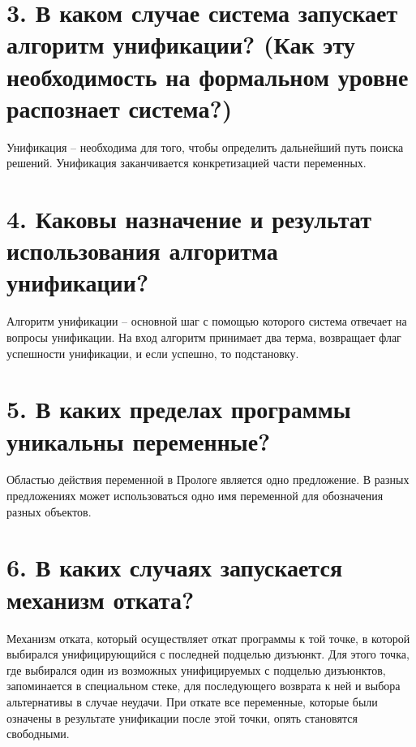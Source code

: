 \section*{3. В каком случае система запускает алгоритм унификации? (Как эту необходимость на формальном уровне распознает система?)}
Унификация – необходима для того, чтобы определить дальнейший путь поиска решений. Унификация заканчивается конкретизацией части переменных.

\section*{4. Каковы назначение и результат использования алгоритма унификации?}
Алгоритм унификации – основной шаг с помощью которого система отвечает на вопросы унификации. 
На вход алгоритм принимает два терма, возвращает флаг успешности унификации, и если успешно, то подстановку.

\section*{5. В каких пределах программы уникальны переменные?}
Областью действия переменной в Прологе является одно предложение.
В разных предложениях может использоваться одно имя переменной для обозначения разных объектов.

\section*{6. В каких случаях запускается механизм отката?}
Механизм отката, который осуществляет откат программы к той точке, в которой выбирался унифицирующийся с последней подцелью дизъюнкт.
Для этого точка, где выбирался один из возможных унифицируемых с подцелью дизъюнктов, запоминается в специальном стеке, для последующего возврата к ней и выбора альтернативы в случае неудачи. 
При откате все переменные, которые были означены в результате унификации после этой точки, опять становятся свободными.